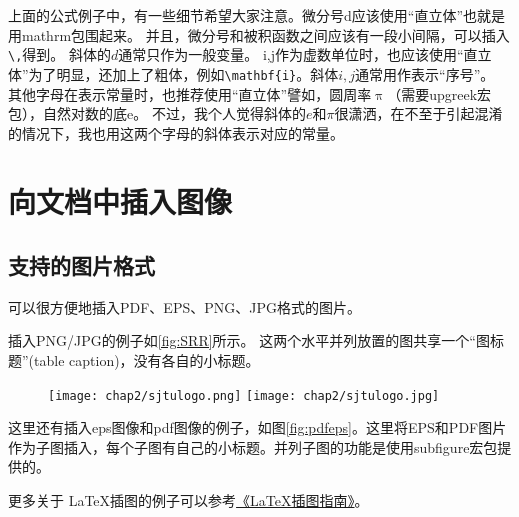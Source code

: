 上面的公式例子中，有一些细节希望大家注意。微分号d应该使用“直立体”也就是用mathrm包围起来。
并且，微分号和被积函数之间应该有一段小间隔，可以插入\verb+\,+得到。
斜体的$d$通常只作为一般变量。
i,j作为虚数单位时，也应该使用“直立体”为了明显，还加上了粗体，例如\verb+\mathbf{i}+。斜体$i,j$通常用作表示“序号”。
其他字母在表示常量时，也推荐使用“直立体”譬如，圆周率$\uppi$（需要upgreek宏包），自然对数的底$\mathrm{e}$。
不过，我个人觉得斜体的$e$和$\pi$很潇洒，在不至于引起混淆的情况下，我也用这两个字母的斜体表示对应的常量。


\section{向文档中插入图像}
\label{sec:insertimage}

\subsection{支持的图片格式}
\label{sec:imageformat}

\XeTeX 可以很方便地插入PDF、EPS、PNG、JPG格式的图片。

插入PNG/JPG的例子如\ref{fig:SRR}所示。
这两个水平并列放置的图共享一个“图标题”(table caption)，没有各自的小标题。

\begin{figure}[!htp]
  \centering
  \texttt{[image: chap2/sjtulogo.png]}
  \hspace{1cm}
  \texttt{[image: chap2/sjtulogo.jpg]}
\end{figure}

这里还有插入eps图像和pdf图像的例子，如图\ref{fig:pdfeps}。这里将EPS和PDF图片作为子图插入，每个子图有自己的小标题。并列子图的功能是使用subfigure宏包提供的。

\begin{figure}
  \centering
  \hspace{1in}
\end{figure}

更多关于 \LaTeX 插图的例子可以参考\href{http://www.cs.duke.edu/junhu/Graphics3.pdf}{《\LaTeX 插图指南》}。

